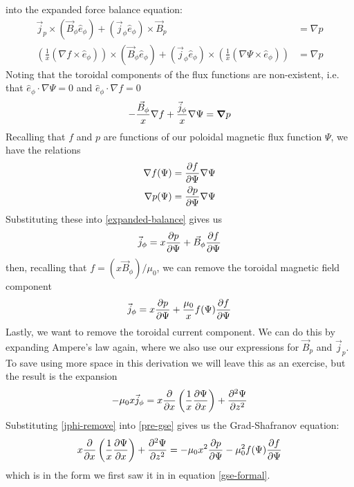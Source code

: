 into the expanded force balance equation:
\begin{align*}
    \vec{j}_p \times (\vec{B}_\phi \hat{e}_{\phi}) + (\vec{j}_{\phi} \hat{e}_{\phi}) \times \vec{B}_p &= \nabla p \\
    \left ( \frac{1}{x} \left ( \nabla f \times \hat{e}_{\phi} \right ) \right ) \times (\vec{B}_\phi \hat{e}_{\phi}) + (\vec{j}_{\phi} \hat{e}_{\phi}) \times \left ( \frac{1}{x} \left ( \nabla \Psi \times \hat{e}_{\phi} \right ) \right ) &= \nabla p
\end{align*}
Noting that the toroidal components of the flux functions are non-existent, i.e. that $\hat{e}_{\phi} \cdot \nabla \Psi = 0$ and $\hat{e}_{\phi} \cdot \nabla f = 0$
\begin{equation}
    \label{expanded-balance} -\frac{\vec{B}_{\phi}}{x} \nabla f  + \frac{\vec{j}_{\phi}}{x} \nabla \Psi = \grad p
\end{equation}
Recalling that $f$ and $p$ are functions of our poloidal magnetic flux function $\Psi$, we have the relations
\begin{align*}
    \nabla f(\Psi) &= \pdv{f}{\Psi} \nabla \Psi \\
    \nabla p(\Psi) &= \pdv{p}{\Psi} \nabla \Psi
\end{align*}
Substituting these into \ref{expanded-balance} gives us
\begin{equation}
    \vec{j}_{\phi} = x \pdv{p}{\Psi} + \vec{B}_{\phi} \pdv{f}{\Psi}
\end{equation}
then, recalling that $f = (x \vec{B}_{\phi}) / \mu_0$, we can remove the toroidal magnetic field component
\begin{equation}
    \label{pre-gse} \vec{j}_{\phi} = x \pdv{p}{\Psi} + \frac{\mu_0}{x} f(\Psi) \pdv{f}{\Psi}
\end{equation}
Lastly, we want to remove the toroidal current component. We can do this by expanding Ampere's law again, where 
we also use our expressions for $\vec{B}_p$ and $\vec{j}_p$. To save using more space in this derivation we will leave this 
as an exercise, but the result is the expansion
\begin{equation}
    \label{jphi-remove} -\mu_0 x \vec{j}_{\phi} = x \pdv{x} \left (\frac{1}{x} \pdv{\Psi}{x} \right ) + \pdv[2]{\Psi}{z}
\end{equation}
Substituting \ref{jphi-remove} into \ref{pre-gse} gives us the Grad-Shafranov equation:
\begin{equation}
    x \pdv{x} \left ( \frac{1}{x} \pdv{\Psi}{x} \right ) + \pdv[2]{\Psi}{z} = -\mu_0 x^2 \pdv{p}{\Psi} - \mu_0^2 f(\Psi) \pdv{f}{\Psi}
\end{equation}
which is in the form we first saw it in in equation \ref{gse-formal}.

